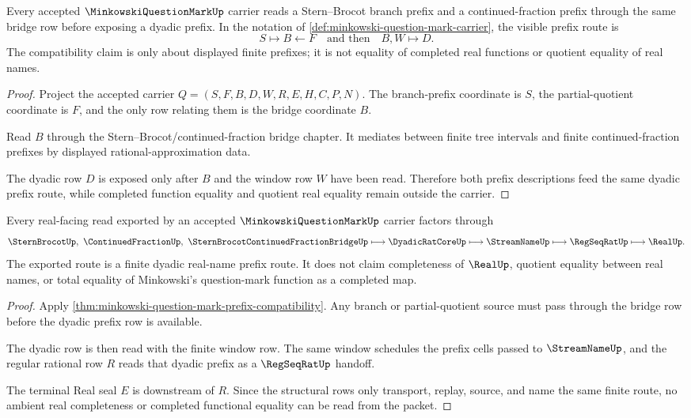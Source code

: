 \begin{theorem}
\label{thm:minkowski-question-mark-prefix-compatibility}
Every accepted $\MinkowskiQuestionMarkUp$ carrier reads a Stern--Brocot branch prefix and a continued-fraction prefix through the same bridge row before exposing a dyadic prefix. In the notation of \autoref{def:minkowski-question-mark-carrier}, the visible prefix route is
$$
S \longmapsto B \longleftarrow F \quad\text{and then}\quad B,W \longmapsto D .
$$
The compatibility claim is only about displayed finite prefixes; it is not equality of completed real functions or quotient equality of real names.
\end{theorem}
\begin{proof}
Project the accepted carrier $Q=(S,F,B,D,W,R,E,H,C,P,N)$. The branch-prefix coordinate is $S$, the partial-quotient coordinate is $F$, and the only row relating them is the bridge coordinate $B$.

Read $B$ through the Stern--Brocot/continued-fraction bridge chapter. It mediates between finite tree intervals and finite continued-fraction prefixes by displayed rational-approximation data.

The dyadic row $D$ is exposed only after $B$ and the window row $W$ have been read. Therefore both prefix descriptions feed the same dyadic prefix route, while completed function equality and quotient real equality remain outside the carrier.
\end{proof}

\begin{theorem}
\label{thm:minkowski-question-mark-dyadic-route}
Every real-facing read exported by an accepted $\MinkowskiQuestionMarkUp$ carrier factors through
$$
\SternBrocotUp,\ \ContinuedFractionUp,\ \SternBrocotContinuedFractionBridgeUp \longmapsto \DyadicRatCoreUp \longmapsto \StreamNameUp \longmapsto \RegSeqRatUp \longmapsto \RealUp .
$$
The exported route is a finite dyadic real-name prefix route. It does not claim completeness of $\RealUp$, quotient equality between real names, or total equality of Minkowski's question-mark function as a completed map.
\end{theorem}
\begin{proof}
Apply \autoref{thm:minkowski-question-mark-prefix-compatibility}. Any branch or partial-quotient source must pass through the bridge row before the dyadic prefix row is available.

The dyadic row is then read with the finite window row. The same window schedules the prefix cells passed to $\StreamNameUp$, and the regular rational row $R$ reads that dyadic prefix as a $\RegSeqRatUp$ handoff.

The terminal Real seal $E$ is downstream of $R$. Since the structural rows only transport, replay, source, and name the same finite route, no ambient real completeness or completed functional equality can be read from the packet.
\end{proof}

